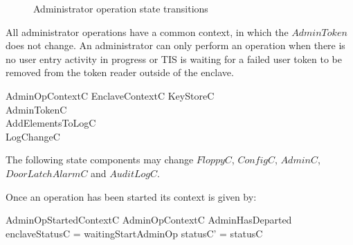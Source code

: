 \begin{figure}[htbp]
  \begin{center}
    \leavevmode
    \caption{Administrator operation state transitions}
    \label{fig:adminOp}
  \end{center}
\end{figure}

All administrator operations have a common context, in which the
$AdminToken$ does not change.
An administrator can only perform an operation when there is no user 
entry activity
in progress or TIS is waiting for a failed user token to be removed
from the token reader outside of the enclave.


\begin{schema}{AdminOpContextC}
        EnclaveContextC
\also
        \Xi KeyStoreC
\\      \Xi AdminTokenC
\\      AddElementsToLogC
\\      LogChangeC
\end{schema}
\begin{Zcomment}
\item
The following state components may change   
$FloppyC$, $ConfigC$, $AdminC$, $DoorLatchAlarmC$ and $AuditLogC$. 
\end{Zcomment}

Once an operation has been started its context is given by:

\begin{schema}{AdminOpStartedContextC}
        AdminOpContextC
\where
        \lnot AdminHasDeparted
\\      enclaveStatusC = waitingStartAdminOp
\also
        statusC' = statusC
\end{schema}

